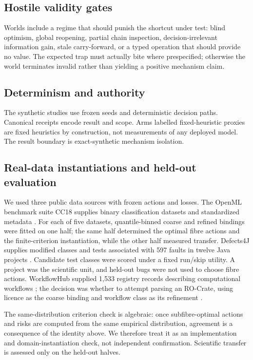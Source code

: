 \subsection{Hostile validity gates}
Worlds include a regime that should punish the shortcut under test: blind optimism, global reopening, partial chain inspection, decision-irrelevant information gain, stale carry-forward, or a typed operation that should provide no value. The expected trap must actually bite where prespecified; otherwise the world terminates invalid rather than yielding a positive mechanism claim.

\subsection{Determinism and authority}
The synthetic studies use frozen seeds and deterministic decision paths. Canonical receipts encode result and scope. Arms labelled fixed-heuristic proxies are fixed heuristics by construction, not measurements of any deployed model. The result boundary is exact-synthetic mechanism isolation.

\subsection{Real-data instantiations and held-out evaluation}
We used three public data sources with frozen actions and losses. The OpenML benchmark suite CC18 supplies binary classification datasets and standardized metadata \cite{bischl2021openmlsuites,vanschoren2014openml}. For each of five datasets, quantile-binned coarse and refined bindings were fitted on one half; the same half determined the optimal fibre actions and the finite-criterion instantiation, while the other half measured transfer. Defects4J supplies modified classes and tests associated with 597 faults in twelve Java projects \cite{just2014defects4j}. Candidate test classes were scored under a fixed run/skip utility. A project was the scientific unit, and held-out bugs were not used to choose fibre actions. WorkflowHub supplied 1,533 registry records describing computational workflows \cite{gustafsson2025workflowhub}; the decision was whether to attempt parsing an RO-Crate, using licence as the coarse binding and workflow class as its refinement \cite{soilandreyes2022rocrate}.

The same-distribution criterion check is algebraic: once subfibre-optimal actions and risks are computed from the same empirical distribution, agreement is a consequence of the identity above. We therefore treat it as an implementation and domain-instantiation check, not independent confirmation. Scientific transfer is assessed only on the held-out halves.

